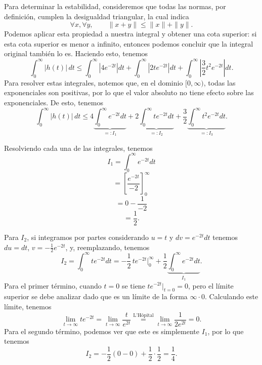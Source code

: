 \documentclass[
  11pt,
  letterpaper,
   addpoints,
   answers
  ]{exam}
\begin{document}
\begin{questions}
\begin{solution}
Para determinar la estabilidad, consideremos que todas las normas, por definición, cumplen la
desigualdad triangular, la cual indica
\begin{equation}
\forall x,\forall y,\qquad \|x+y\| \le \|x\|+\|y\|.
\end{equation}
Podemos aplicar esta propiedad a nuestra integral y obtener una cota superior: si esta cota superior
es menor a infinito, entonces podemos concluir que la integral original también lo es. Haciendo esto, tenemos
\begin{equation}
\int_{0}^{\infty} |h(t)|\,dt
\le \int_{0}^{\infty} \left|4e^{-2t}\right| dt
+ \int_{0}^{\infty} \left|2t e^{-2t}\right| dt
+ \int_{0}^{\infty} \left|\frac{3}{2}t^{2}e^{-2t}\right| dt .
\end{equation}
Para resolver estas integrales, notemos que, en el dominio $[0,\infty)$, todas las exponenciales son
positivas, por lo que el valor absoluto no tiene efecto sobre las exponenciales. De esto, tenemos
\begin{equation}
\int_{0}^{\infty} |h(t)|\,dt \le
4\underbrace{\int_{0}^{\infty} e^{-2t}dt}_{=:I_1}
+2\underbrace{\int_{0}^{\infty} t e^{-2t}dt}_{=:I_2}
+\frac{3}{2}\underbrace{\int_{0}^{\infty} t^{2} e^{-2t}dt}_{=:I_3}.
\end{equation}

Resolviendo cada una de las integrales, tenemos
\begin{equation}
I_1=\int_{0}^{\infty} e^{-2t}dt
\end{equation}
\begin{equation}
=\left[\frac{e^{-2t}}{-2}\right]_{0}^{\infty}
\end{equation}
\begin{equation}
=0-\frac{1}{-2}
\end{equation}
\begin{equation}
=\frac{1}{2}.
\end{equation}

Para $I_2$, si integramos por partes considerando $u=t$ y $dv=e^{-2t}dt$ tenemos $du=dt$, $v=-\tfrac{1}{2}e^{-2t}$, y, reemplazando, tenemos
\begin{equation}
I_2=\int_{0}^{\infty} t e^{-2t}dt
=-\frac{1}{2}\, t e^{-2t}\Big|_{0}^{\infty}
+\frac{1}{2}\underbrace{\int_{0}^{\infty} e^{-2t}dt}_{I_1}.
\end{equation}
Para el primer término, cuando $t=0$ se tiene $t e^{-2t}\big|_{t=0}=0$, pero el límite superior se debe
analizar dado que es un límite de la forma $\infty\cdot 0$. Calculando este límite, tenemos
\begin{equation}
\lim_{t\to\infty} t e^{-2t}
=\lim_{t\to\infty}\frac{t}{e^{2t}}
\stackrel{\text{L'H\^opital}}{=} \lim_{t\to\infty}\frac{1}{2e^{2t}}=0.
\end{equation}
Para el segundo término, podemos ver que este es simplemente $I_1$, por lo que tenemos
\begin{equation}
I_2=-\frac{1}{2}(0-0)+\frac{1}{2}\cdot\frac{1}{2}=\frac{1}{4}.
\end{equation}


\end{solution}
\end{questions}
\end{document}
